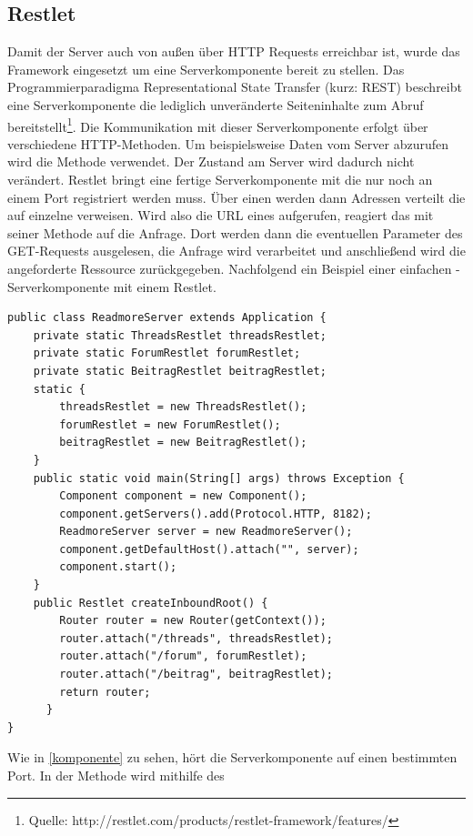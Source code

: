 \subsection{Restlet}
Damit der Server auch von außen über HTTP Requests erreichbar ist, wurde das
Framework  eingesetzt um eine 
Serverkomponente bereit zu stellen. Das Programmierparadigma Representational
State Transfer (kurz: REST) beschreibt eine Serverkomponente die lediglich
unveränderte Seiteninhalte zum Abruf bereitstellt\footnote{Quelle:
http://restlet.com/products/restlet-framework/features/}. Die Kommunikation mit dieser Serverkomponente erfolgt über verschiedene HTTP-Methoden. Um beispielsweise
Daten vom Server abzurufen wird die Methode  verwendet. Der Zustand am Server
wird dadurch nicht verändert. Restlet bringt eine fertige Serverkomponente mit
die nur noch an einem Port registriert werden muss. Über einen
 werden dann Adressen verteilt die auf einzelne
 verweisen. Wird also die URL eines 
aufgerufen, reagiert das  mit seiner Methode
 auf die Anfrage. Dort werden dann die eventuellen Parameter des
GET-Requests ausgelesen, die Anfrage wird verarbeitet und anschließend wird die
angeforderte Ressource zurückgegeben. Nachfolgend ein Beispiel einer einfachen
-Serverkomponente mit einem Restlet.
\begin{lstlisting}[caption=Die Serverkomponente, label=komponente]
public class ReadmoreServer extends Application {
	private static ThreadsRestlet threadsRestlet;
	private static ForumRestlet forumRestlet;
	private static BeitragRestlet beitragRestlet;
	static {
		threadsRestlet = new ThreadsRestlet();
		forumRestlet = new ForumRestlet();
		beitragRestlet = new BeitragRestlet();
	}
	public static void main(String[] args) throws Exception {
		Component component = new Component();
		component.getServers().add(Protocol.HTTP, 8182);
		ReadmoreServer server = new ReadmoreServer();
		component.getDefaultHost().attach("", server);
		component.start();
	}
	public Restlet createInboundRoot() {
	    Router router = new Router(getContext());
	    router.attach("/threads", threadsRestlet);
	    router.attach("/forum", forumRestlet);
	    router.attach("/beitrag", beitragRestlet);
	    return router;
	  }
}
\end{lstlisting}
Wie in \ref{komponente} zu sehen, hört die Serverkomponente auf einen bestimmten
Port. In der Methode  wird mithilfe des 
